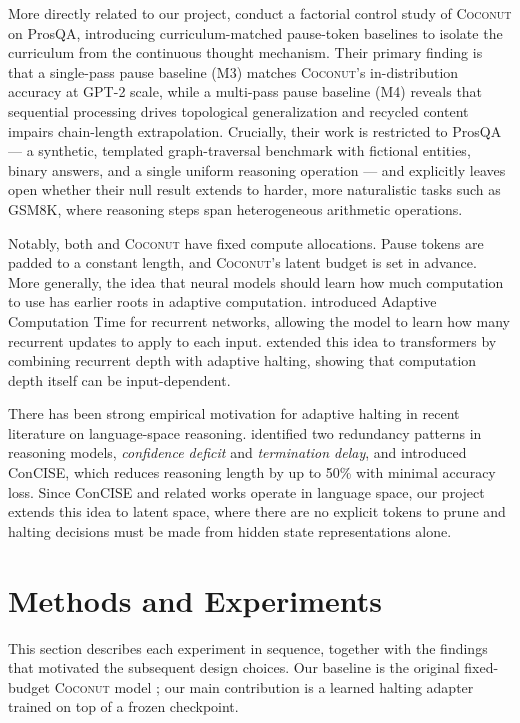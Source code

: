 \documentclass{article}
\begin{document}
More directly related to our project, \citet{martin2025curriculum} conduct a factorial control study of \textsc{Coconut} on ProsQA, introducing curriculum-matched pause-token baselines to isolate the curriculum from the continuous thought mechanism. Their primary finding is that a single-pass pause baseline (M3) matches \textsc{Coconut}'s in-distribution accuracy at GPT-2 scale, while a multi-pass pause baseline (M4) reveals that sequential processing drives topological generalization and recycled content impairs chain-length extrapolation. Crucially, their work is restricted to ProsQA --- a synthetic, templated graph-traversal benchmark with fictional entities, binary answers, and a single uniform reasoning operation --- and explicitly leaves open whether their null result extends to harder, more naturalistic tasks such as GSM8K, where reasoning steps span heterogeneous arithmetic operations.

Notably, both \citet{pause2024} and \textsc{Coconut} have fixed compute allocations. Pause tokens are padded to a constant length, and \textsc{Coconut}'s latent budget is set in advance. More generally, the idea that neural models should learn how much computation to use has earlier roots in adaptive computation. \citet{act2016} introduced Adaptive Computation Time for recurrent networks, allowing the model to learn how many recurrent updates to apply to each input. \citet{universal2018} extended this idea to transformers by combining recurrent depth with adaptive halting, showing that computation depth itself can be input-dependent.

There has been strong empirical motivation for adaptive halting in recent literature on language-space reasoning. \citet{concise2025} identified two redundancy patterns in reasoning models, \textit{confidence deficit} and \textit{termination delay}, and introduced ConCISE, which reduces reasoning length by up to 50\% with minimal accuracy loss. Since ConCISE and related works operate in language space, our project extends this idea to latent space, where there are no explicit tokens to prune and halting decisions must be made from hidden state representations alone.

\section{Methods and Experiments}

This section describes each experiment in sequence, together with the findings that motivated the subsequent design choices. Our baseline is the original fixed-budget \textsc{Coconut} model \citep{coconut2025}; our main contribution is a learned halting adapter trained on top of a frozen checkpoint.
\end{document}
